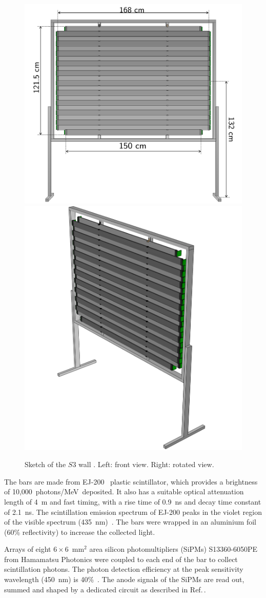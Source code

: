 \begin{figure}
  \centering
  \includegraphics[width=0.54\linewidth]{files/Figures/uToF_sketch.pdf}
  \hfill
  \includegraphics[width=0.43\linewidth]{files/Figures/uTOF_rot.pdf}
  \caption{Sketch of the $\mathit{S3}$ wall \cite{S3-proceedings}.
  Left: front view. Right: rotated view.}
  \label{fig:S3sketch}
\end{figure}

The bars are made from EJ-200~\cite{SCIONIX} plastic scintillator, which provides a brightness of 10,000~photons/MeV~deposited.
It also has a suitable optical attenuation length of 4~m and fast timing, with a rise time of 0.9~ns and decay time constant of 2.1~ns.
The scintillation emission spectrum of EJ-200 peaks in the violet region of the visible spectrum (435~nm)~\cite{EJ200}.
The bars were wrapped in an aluminium foil (60\% reflectivity) to increase the collected light.

Arrays of eight $6 \times 6$~mm$^2$ area silicon photomultipliers (SiPMs) S13360-6050PE from Hamamatsu Photonics \cite{Hamamatsu} were coupled to each end of the bar to collect scintillation photons.
The photon detection efficiency at the peak sensitivity wavelength (450~nm) is 40\%~\cite{Hamamatsu}.
The anode signals of the SiPMs are read out, summed and shaped by a dedicated circuit as described in Ref.\,\cite{S3-readout}.

